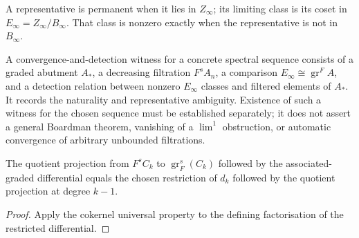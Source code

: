 \begin{definition}
  \label{def:ss-permanent-einfty-class}
  \notready
  A representative is permanent when it lies in $Z_\infty$; its limiting
  class is its coset in $E_\infty=Z_\infty/B_\infty$.  That class is nonzero
  exactly when the representative is not in $B_\infty$.
\end{definition}

\begin{definition}
  \label{def:ss-convergence-detection-witness}
  \leanok
  A convergence-and-detection witness for a concrete spectral sequence consists
  of a graded abutment $A_*$, a decreasing filtration $F^sA_n$, a comparison
  $E_\infty\cong\operatorname{gr}^F A$, and a detection relation between
  nonzero $E_\infty$ classes and filtered elements of $A_*$.  It records the
  naturality and representative ambiguity. Existence of such a witness
  for the chosen sequence must be established separately; it does
  not assert a general Boardman theorem, vanishing of a $\lim^1$ obstruction,
  or automatic convergence of arbitrary unbounded filtrations.
\end{definition}

\begin{lemma}
  \label{lem:filtered-associated-graded-differential-projection}
  \leanok
  The quotient projection from $F^sC_k$ to
  $\operatorname{gr}^s_F(C_k)$ followed by the associated-graded differential
  equals the chosen restriction of $d_k$ followed by the quotient projection at
  degree $k-1$.
\end{lemma}

\begin{proof}
  \leanok
  Apply the cokernel universal property to the defining factorisation of the
  restricted differential.
\end{proof}

